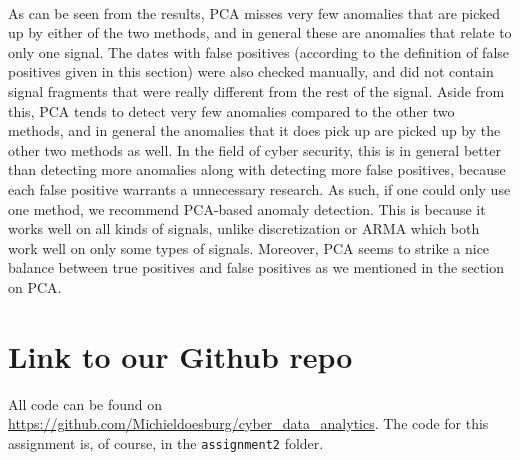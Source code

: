\documentclass[]{article}
\begin{document}
\\
As can be seen from the results, PCA misses very few anomalies that are picked up by either of the two methods, and in general these are anomalies that relate to only one signal. The dates with false positives (according to the definition of false positives given in this section) were also checked manually, and did not contain signal fragments that were really different from the rest of the signal. Aside from this, PCA tends to detect very few anomalies compared to the other two methods, and in general the anomalies that it does pick up are picked up by the other two methods as well. In the field of cyber security, this is in general better than detecting more anomalies along with detecting more false positives, because each false positive warrants a unnecessary research. As such, if one could only use one method, we recommend PCA-based anomaly detection. This is because it works well on all kinds of signals, unlike discretization or ARMA which both work well on only some types of signals. Moreover, PCA seems to strike a nice balance between true positives and false positives as we mentioned in the section on PCA.

\section{Link to our Github repo}
All code can be found on \url{https://github.com/Michieldoesburg/cyber_data_analytics}. The code for this assignment is, of course, in the \texttt{assignment2} folder.


\end{document}
